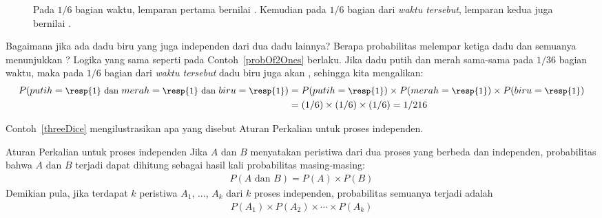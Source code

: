 \begin{figure}[hht]
\centering
{}
\caption{Pada $1/6$ bagian waktu, lemparan pertama bernilai . Kemudian pada $1/6$ bagian dari \emph{waktu tersebut}, lemparan kedua juga bernilai .}
\label{indepForRollingTwo1s}
\end{figure}

\begin{examplewrap}
\begin{nexample}{Bagaimana jika ada dadu biru yang juga independen dari dua dadu lainnya? Berapa probabilitas melempar ketiga dadu dan semuanya menunjukkan ?}\label{threeDice}
Logika yang sama seperti pada Contoh~\ref{probOf2Ones} berlaku. Jika dadu putih dan merah sama-sama  pada $1/36$ bagian waktu, maka pada $1/6$ bagian dari \emph{waktu tersebut} dadu biru juga akan , sehingga kita mengalikan:
{\begin{align*}
P(putih=\text{\small\resp{1} dan } merah=\text{\small\resp{1} dan } biru=\text{\small\resp{1}})
	&= P(putih=\text{\small\resp{1}})\times P(merah=\text{\small\resp{1}})\times P(biru=\text{\small\resp{1}}) \\
	&= (1/6)\times (1/6)\times (1/6)
	= 1/216
\end{align*}} \vspace{-7mm}
\end{nexample}
\end{examplewrap}

Contoh~\ref{threeDice} mengilustrasikan apa yang disebut Aturan Perkalian untuk proses independen.

\begin{onebox}{Aturan Perkalian untuk proses independen}
  Jika $A$ dan $B$ menyatakan peristiwa dari dua proses
  yang berbeda dan independen, probabilitas bahwa $A$
  dan $B$ terjadi dapat dihitung sebagai hasil kali
  probabilitas masing-masing:
  \begin{align*}
  P(A \text{ dan }B) = P(A) \times  P(B)
  \end{align*}
  Demikian pula, jika terdapat $k$ peristiwa $A_1$, ..., $A_k$
  dari $k$ proses independen, probabilitas semuanya terjadi adalah
  \begin{align*}
  P(A_1) \times  P(A_2)\times  \cdots \times  P(A_k)
  \end{align*}\vspace{-6mm}
\end{onebox}

